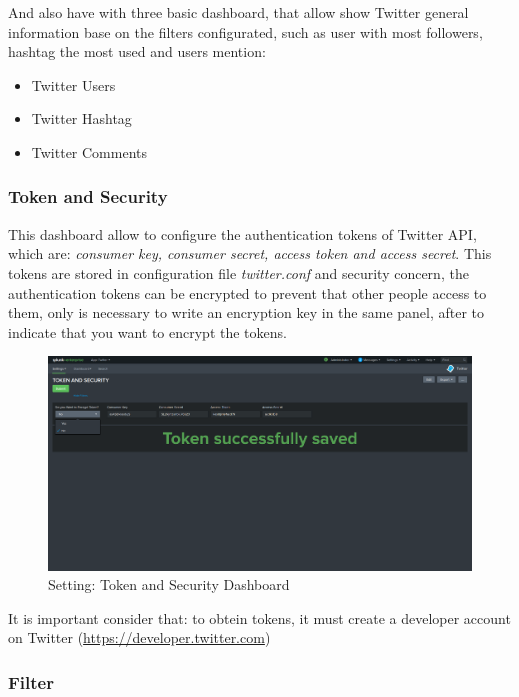 \documentclass[report]{article}
\begin{document}
And also have with three basic dashboard, that allow show Twitter general information base on the filters configurated, such as user with most followers, hashtag the most used and users mention:
\newline
\begin{itemize}
\item Twitter Users
\item Twitter Hashtag
\item Twitter Comments
\newline
\end{itemize}

\subsubsection{Token and Security}

This dashboard allow to configure the authentication tokens of Twitter API, which are: \textit{consumer key, consumer secret, access token and access secret}. This tokens are stored in configuration file \textit{twitter.conf} and security concern, the authentication tokens can be encrypted to prevent that other people access to them, only is necessary to write an encryption key in the same panel, after to indicate that you want to encrypt the tokens.
\newline
\begin{figure}[h!]
	\centering
	\includegraphics[scale=0.2]{img/token.png}
	\caption{\color{text}Setting: Token and Security Dashboard}
\end{figure}
\newline
It is important consider that: to obtein tokens, it must create a developer account on Twitter (\url{https://developer.twitter.com})
\newpage
\subsubsection{Filter}
\end{document}
